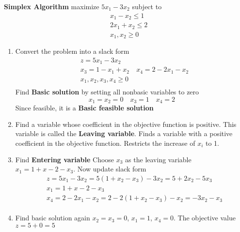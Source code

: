\documentclass[11pt]{article}
\begin{document}
\begin{defn*}
    \textbf{Simplex Algorithm} 
    maximize $5 x_1 - 3x_2$ subject to 
    \begin{align*}  
        & x_1 - x_2 \leq 1 \\
        & 2x_1+ x_2 \leq 2 \\
        & x_1, x_2 \geq 0
    \end{align*}

    \begin{enumerate}
        \item Convert the problem into a slack form 
        \begin{align*}
            & z = 5 x_1 - 3x_2 \\
            & x_3 = 1 - x_1 + x_2 \
            & x_4 = 2 - 2 x_1 - x_2 \\
            & x_1,x_2,x_3,x_4 \geq 0\\
        \end{align*}
        Find \textbf{Basic solution} by setting all nonbasic variables to zero 
        \[
            x_1 = x_2 = 0 \quad x_3 = 1 \quad x_4 = 2
        \]
        Since feasible, it is a \textbf{Basic feasible solution}
        \item Find a variable whose coefficient in the objective function is positive. This variable is called the \textbf{Leaving variable}. Finds a variable with a positive coefficient in the objective function. Restricts the increase of $x_i$ to 1. 
        \item Find \textbf{Entering variable} Choose $x_3$ as the leaving variable $x_1 = 1 + x-2 - x_3$. Now update slack form
        \begin{align*}
            & z = 5 x_1 - 3x_2 = 5(1 + x_2 - x_3) - 3x_2 = 5 + 2x_2 -5x_3\\
            & x_1 = 1 + x-2 - x_3 \\
            & x_4 = 2 - 2 x_1 - x_2 = 2 - 2(1 + x_2 - x_3) - x_2 = -3x_2 - x_3 \\
        \end{align*}
        \item Find basic solution again $x_2 = x_3 = 0$, $x_1 = 1$, $x_4 = 0$. The objective value $z = 5 + 0 = 5$
    \end{enumerate}
\end{defn*}
\end{document}
